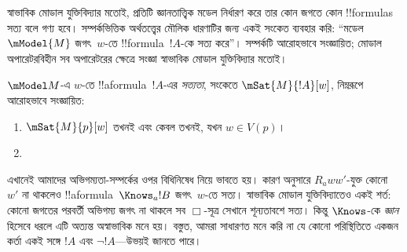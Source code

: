 \documentclass[../../../include/open-logic-section]{subfiles}
\begin{document}


স্বাভাবিক মোডাল যুক্তিবিদ্যার মতোই, প্রতিটি জ্ঞানতাত্ত্বিক মডেল নির্ধারণ করে তার কোন জগতে কোন !!{formula}s সত্য বলে গণ্য হবে। সম্পর্কভিত্তিক অর্থতত্ত্বের মৌলিক ধারণাটির জন্য একই সংকেত ব্যবহার করি: ``মডেল~$\mModel{M}$ জগৎ~$w$-তে !!{formula}~$!A$-কে সত্য করে''। সম্পর্কটি আরোহভাবে সংজ্ঞায়িত; মোডাল অপারেটরবিহীন সব অপারেটরের ক্ষেত্রে সংজ্ঞা স্বাভাবিক মোডাল যুক্তিবিদ্যার মতোই।

\begin{defn}
  $\mModel M$-এ $w$-তে !!a{formula}~$!A$-এর \emph{সত্যতা}, সংকেতে
  $\mSat{M}{!A}[w]$, নিম্নরূপে আরোহভাবে সংজ্ঞায়িত:
  \begin{enumerate}
  \item $\mSat{M}{p}[w]$ তখনই এবং কেবল তখনই, যখন $w \in V(p)$।
  \item{}
  \end{enumerate}
\end{defn}

এখানেই আমাদের অভিগম্যতা-সম্পর্কের ওপর বিধিনিষেধ নিয়ে ভাবতে হয়। কারণ  অনুসারে $R_a ww'$-যুক্ত কোনো~$w'$ না থাকলেও !!a{formula}~$\Knows_a !B$ জগৎ~$w$-তে সত্য। স্বাভাবিক মোডাল যুক্তিবিদ্যাতেও একই শর্ত: কোনো জগতের পরবর্তী অভিগম্য জগৎ না থাকলে সব $\Box$-সূত্র সেখানে শূন্যতাবশে সত্য। কিন্তু $\Knows$-কে \emph{জ্ঞান} হিসেবে ধরলে এটি অত্যন্ত অস্বাভাবিক মনে হয়। বস্তুত, আমরা সাধারণত মনে করি না যে কোনো পরিস্থিতিতে একজন কর্তা একই সঙ্গে $!A$ এবং $\lnot !A$—উভয়ই জানতে পারে।
\end{document}
